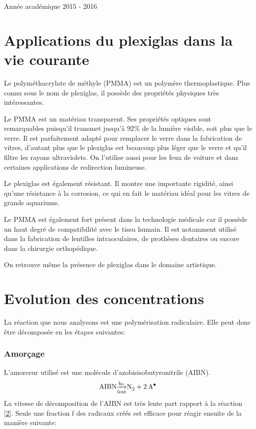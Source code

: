 \documentclass[a4paper,oneside,12pt]{article}
\begin{document}
\begin{titlepage}
	\vspace{0.4cm}
	
	{\normalsize Année académique 2015 - 2016}\\
	
\end{titlepage}

\part{Applications du plexiglas dans la vie courante}

Le polyméthacrylate de méthyle (PMMA) est un polymère thermoplastique. Plus connu sous le nom de plexiglas, il possède des propriétés physiques très intéressantes.

Le PMMA est un matériau transparent. Ses propriétés optiques sont remarquables puisqu'il transmet jusqu'à $92\%$ de la lumière visible, soit plus que le verre. Il est parfaitement adapté pour remplacer le verre dans la fabrication de vitres, d'autant plus que le plexiglas est beaucoup plus léger que le verre et qu'il filtre les rayons ultraviolets. On l'utilise aussi pour les feux de voiture et dans certaines applications de redirection lumineuse.

Le plexiglas est également résistant. Il montre une importante rigidité, ainsi qu'une résistance à la corrosion, ce qui en fait le matériau idéal pour les vitres de grands aquariums.

Le PMMA est également fort présent dans la technologie médicale car il possède un haut degré de compatibilité avec le tissu humain.
Il est notamment utilisé dans la fabrication de lentilles intraoculaires, de prothèses dentaires ou encore dans la chirurgie orthopédique. 

On retrouve même la présence de plexiglas dans le domaine artistique.

\part{Evolution des concentrations}
La réaction que nous analysons est une polymérisation radicalaire. Elle peut donc être décomposée en les étapes suivantes:
\section{Amorçage}
L'amorceur utilisé est une molécule d'azobisisobutyronitrile (AIBN). 
\begin{equation}
	\ce{AIBN \underset{lent}{\xrightarrow{k_0}} N2 + 2A^\bullet}
\end{equation}	
La vitesse de décomposition de l'AIBN est très lente part rapport à la réaction \ref{2}. Seule une fraction f des radicaux créés est efficace pour réagir ensuite de la manière suivante:
\end{document}
